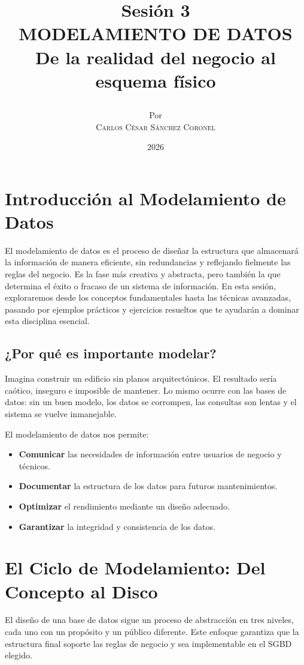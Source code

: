 \documentclass[12pt,a4paper,openany,oneside]{book}
\title{
    \textbf{Sesión 3} \\ 
    \Huge \textbf{MODELAMIENTO DE DATOS} \\
        \Large De la realidad del negocio al esquema físico
    
}
\author{
    \small Por \\ \vspace{0.2cm}
    \Large \textsc{Carlos César Sánchez Coronel}
}
\date{2026}
\begin{document}
\maketitle

\tableofcontents
{}

\chapter{Introducción al Modelamiento de Datos}
El modelamiento de datos es el proceso de diseñar la estructura que almacenará la información de manera eficiente, sin redundancias y reflejando fielmente las reglas del negocio. Es la fase más creativa y abstracta, pero también la que determina el éxito o fracaso de un sistema de información. En esta sesión, exploraremos desde los conceptos fundamentales hasta las técnicas avanzadas, pasando por ejemplos prácticos y ejercicios resueltos que te ayudarán a dominar esta disciplina esencial.

\section{¿Por qué es importante modelar?}
Imagina construir un edificio sin planos arquitectónicos. El resultado sería caótico, inseguro e imposible de mantener. Lo mismo ocurre con las bases de datos: sin un buen modelo, los datos se corrompen, las consultas son lentas y el sistema se vuelve inmanejable.

El modelamiento de datos nos permite:
\begin{itemize}
    \item \textbf{Comunicar} las necesidades de información entre usuarios de negocio y técnicos.
    \item \textbf{Documentar} la estructura de los datos para futuros mantenimientos.
    \item \textbf{Optimizar} el rendimiento mediante un diseño adecuado.
    \item \textbf{Garantizar} la integridad y consistencia de los datos.
\end{itemize}

\chapter{El Ciclo de Modelamiento: Del Concepto al Disco}
El diseño de una base de datos sigue un proceso de abstracción en tres niveles, cada uno con un propósito y un público diferente. Este enfoque garantiza que la estructura final soporte las reglas de negocio y sea implementable en el SGBD elegido.
\end{document}
